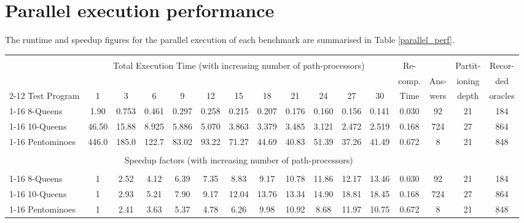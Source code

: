\section{Parallel execution performance} %

The runtime and speedup figures for the parallel execution of each benchmark are summarised
in Table \ref{parallel_perf}.

\begin{sidewaystable}
{\small
\begin{tabular}{||l|c|c|c|c|c|c|c|c|c|c|c|c|c|c|c||} \hline
 & \multicolumn{11}{c|}{} & & &  & \\
 & \multicolumn{11}{c|}{ Total Execution Time (with increasing number of path-processors) }                          & Re-   &      & Partit-& Recor- \\
 & \multicolumn{11}{c|}{}                                                                                            & comp. & Ans- & ioning & ded    \\
  \cline{2-12} Test Program & 1     & 3     & 6     & 9     & 12    & 15    & 18    & 21    & 24    & 27    & 30     & Time  & wers & depth  & oracles\\
  \cline{1-16} 8-Queens     & 1.90  & 0.753 & 0.461 & 0.297 & 0.258 & 0.215 & 0.207 & 0.176 & 0.160 & 0.156 & 0.141  & 0.030 &  92  & 21     & 184  \\
  \cline{1-16} 10-Queens    & 46.50 & 15.88 & 8.925 & 5.886 & 5.070 & 3.863 & 3.379 & 3.485 & 3.121 & 2.472 & 2.519  & 0.168 & 724  & 27     & 864   \\
  \cline{1-16} Pentominoes  & 446.0 & 185.0 & 122.7 & 83.02 & 93.22 & 71.27 & 44.69 & 40.83 & 51.39 & 37.26 & 41.49  & 0.672 &   8  & 21     & 848 \\
\hline
 & \multicolumn{11}{c|}{} & & & & \\
 & \multicolumn{11}{c|}{ Speedup factors (with increasing number of path-processors) } & & & & \\
 & \multicolumn{11}{c|}{} & & & &  \\
  \cline{1-16} 8-Queens    & 1      & 2.52  & 4.12  & 6.39  & 7.35  & 8.83  & 9.17  & 10.78 & 11.86 & 12.17 & 13.46  & 0.030 &  92  & 21     & 184  \\
  \cline{1-16} 10-Queens   & 1      & 2.93  & 5.21  & 7.90  & 9.17  & 12.04 & 13.76 & 13.34 & 14.90 & 18.81 & 18.45  & 0.168 & 724  & 27     & 864   \\
  \cline{1-16} Pentominoes & 1      & 2.41  & 3.63  & 5.37  & 4.78  & 6.26  & 9.98  & 10.92 & 8.68  & 11.97 & 10.75  & 0.672 &   8  & 21     & 848 \\
\hline
\end{tabular}
\caption[Parallel execution performance of PrologPF]{Parallel execution
                            performance of PrologPF for
                            appropriate partitioning-depths.}
\label{parallel_perf}
}
\end{sidewaystable}

